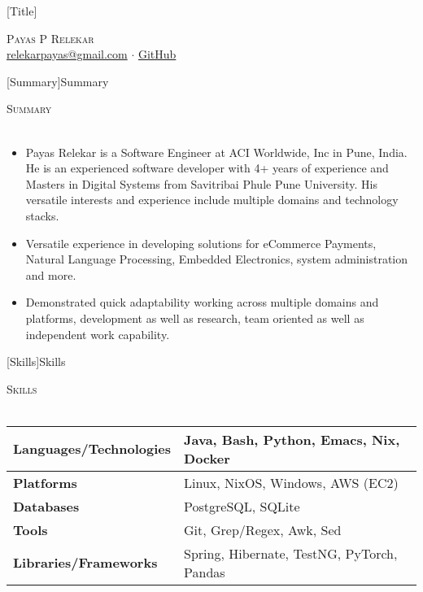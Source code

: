 \documentclass[a4paper]{article}
\newcommand{\lineunder} {
    \vspace*{-8pt} \\
    \hspace*{-18pt} \hrulefill \\
}
\newcommand{\header} [1] {
    {\hspace*{-18pt}\vspace*{6pt} \textsc{#1}}
    \vspace*{-6pt} \lineunder
}
\begin{document}
\vspace*{-40pt}

\vspace*{-10pt}
[Title]{}
\begin{center}
  {\Huge \scshape {Payas P Relekar}}\\
  \href{mailto:relekarpayas@gmail.com}{relekarpayas@gmail.com} $\cdot$ \href{https://github.com/bhankas/}{GitHub}\\
\end{center}

[Summary]{Summary}
\header{Summary}
\vspace{1mm}

\begin{itemize} \itemsep 1pt
  \item Payas Relekar is a Software Engineer at ACI Worldwide, Inc in Pune, India. He is an experienced software developer with 4+ years of experience and Masters in Digital Systems from Savitribai Phule Pune University. His versatile interests and experience include multiple domains and technology stacks.
  \item Versatile experience in developing solutions for eCommerce Payments, Natural Language Processing, Embedded Electronics, system administration and more.
  \item Demonstrated quick adaptability working across multiple domains and platforms, development as well as research, team oriented as well as independent work capability.
\end{itemize}

[Skills]{Skills}
\header{Skills}
\vspace{1mm}
\bgroup
\setlength{\arrayrulewidth}{0.2mm}
\def\arraystretch{1.2}
\begin{tabularx}{\textwidth}{ | X | X | }
  \hline
  \textbf{Languages/Technologies} & Java, Bash, Python, Emacs, Nix, Docker        \\
  \hline
  \textbf{Platforms}             & Linux, NixOS, Windows, AWS (EC2)          \\
  \hline
  \textbf{Databases}             & PostgreSQL, SQLite          \\
  \hline
  \textbf{Tools}                 & Git, Grep/Regex, Awk, Sed            \\
  \hline
  \textbf{Libraries/Frameworks}  & Spring, Hibernate, TestNG, PyTorch, Pandas \\
  \hline
\end{tabularx}
\egroup
\vspace{2mm}
\end{document}
